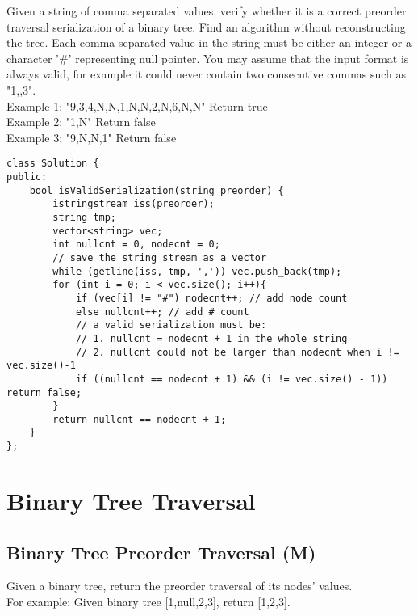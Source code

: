 Given a string of comma separated values, verify whether it is a correct preorder traversal serialization of a binary tree. Find an algorithm without reconstructing the tree. Each comma separated value in the string must be either an integer or a character '\#' representing null pointer. You may assume that the input format is always valid, for example it could never contain two consecutive commas such as "1,,3". \\

Example 1:
"9,3,4,N,N,1,N,N,2,N,6,N,N"
Return true\\

Example 2:
"1,N"
Return false\\

Example 3:
"9,N,N,1"
Return false\\

\begin{lstlisting}
class Solution {
public:
    bool isValidSerialization(string preorder) {
        istringstream iss(preorder);
        string tmp;
        vector<string> vec;
        int nullcnt = 0, nodecnt = 0;
        // save the string stream as a vector
        while (getline(iss, tmp, ',')) vec.push_back(tmp); 
        for (int i = 0; i < vec.size(); i++){
            if (vec[i] != "#") nodecnt++; // add node count
            else nullcnt++; // add # count
            // a valid serialization must be:
            // 1. nullcnt = nodecnt + 1 in the whole string
            // 2. nullcnt could not be larger than nodecnt when i != vec.size()-1
            if ((nullcnt == nodecnt + 1) && (i != vec.size() - 1)) return false;
        }
        return nullcnt == nodecnt + 1;
    }
};
\end{lstlisting}


\section{Binary Tree Traversal}
\subsection{Binary Tree Preorder Traversal (M)}
Given a binary tree, return the preorder traversal of its nodes' values.\\

For example: Given binary tree [1,null,2,3], return [1,2,3]. \\

